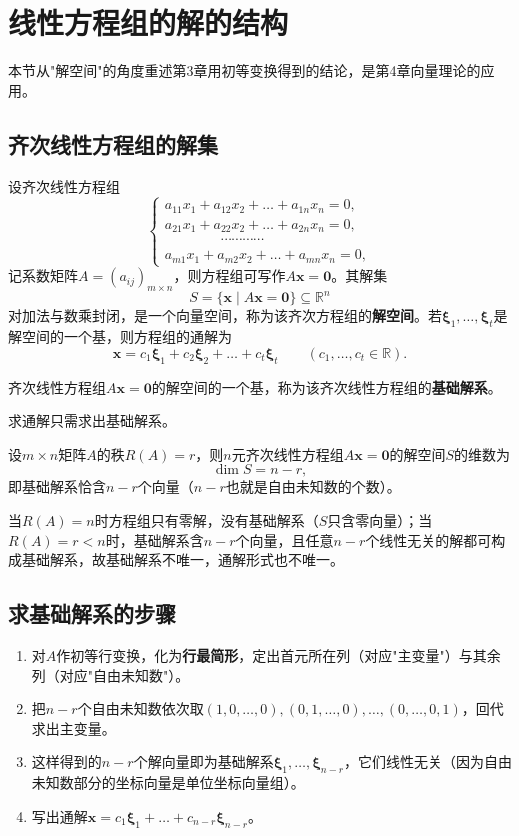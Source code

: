 \section{线性方程组的解的结构}

本节从"解空间"的角度重述第3章用初等变换得到的结论，是第4章向量理论的应用。

\subsection{齐次线性方程组的解集}
设齐次线性方程组
\[
\begin{cases}
a_{11}x_1+a_{12}x_2+\dots+a_{1n}x_n=0,\\
a_{21}x_1+a_{22}x_2+\dots+a_{2n}x_n=0,\\
\qquad\qquad\cdots\cdots\cdots\cdots\\
a_{m1}x_1+a_{m2}x_2+\dots+a_{mn}x_n=0,
\end{cases}
\]
记系数矩阵$A=(a_{ij})_{m\times n}$，则方程组可写作$A\boldsymbol{x}=\boldsymbol{0}$。其解集
\[
S=\{\boldsymbol{x}\mid A\boldsymbol{x}=\boldsymbol{0}\}\subseteq\mathbb{R}^{n}
\]
对加法与数乘封闭，是一个向量空间，称为该齐次方程组的\textbf{解空间}。若$\boldsymbol{\xi}_1,\dots,\boldsymbol{\xi}_{t}$是解空间的一个基，则方程组的通解为
\[
\boldsymbol{x}=c_1\boldsymbol{\xi}_1+c_2\boldsymbol{\xi}_2+\dots+c_t\boldsymbol{\xi}_{t}\qquad(c_1,\dots,c_t\in\mathbb{R}).
\]

\begin{definition}[基础解系]
齐次线性方程组$A\boldsymbol{x}=\boldsymbol{0}$的解空间的一个基，称为该齐次线性方程组的\textbf{基础解系}。
\end{definition}

求通解只需求出基础解系。

\begin{theorem}[解空间的维数]
设$m\times n$矩阵$A$的秩$R(A)=r$，则$n$元齐次线性方程组$A\boldsymbol{x}=\boldsymbol{0}$的解空间$S$的维数为
\[
\dim S=n-r,
\]
即基础解系恰含$n-r$个向量（$n-r$也就是自由未知数的个数）。
\end{theorem}

当$R(A)=n$时方程组只有零解，没有基础解系（$S$只含零向量）；当$R(A)=r<n$时，基础解系含$n-r$个向量，且任意$n-r$个线性无关的解都可构成基础解系，故基础解系不唯一，通解形式也不唯一。

\subsection{求基础解系的步骤}
\begin{enumerate}
    \item 对$A$作初等行变换，化为\textbf{行最简形}，定出首元所在列（对应"主变量"）与其余列（对应"自由未知数"）。
    \item 把$n-r$个自由未知数依次取$(1,0,\dots,0),(0,1,\dots,0),\dots,(0,\dots,0,1)$，回代求出主变量。
    \item 这样得到的$n-r$个解向量即为基础解系$\boldsymbol{\xi}_1,\dots,\boldsymbol{\xi}_{n-r}$，它们线性无关（因为自由未知数部分的坐标向量是单位坐标向量组）。
    \item 写出通解$\boldsymbol{x}=c_1\boldsymbol{\xi}_1+\dots+c_{n-r}\boldsymbol{\xi}_{n-r}$。
\end{enumerate}

